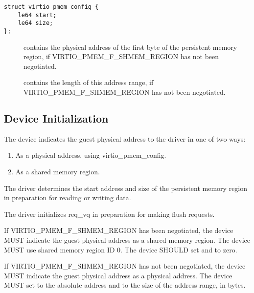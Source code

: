 \begin{lstlisting}
struct virtio_pmem_config {
	le64 start;
	le64 size;
};
\end{lstlisting}

\begin{description}
\item[] contains the physical address of the first byte of the
persistent memory region, if VIRTIO_PMEM_F_SHMEM_REGION has not been negotiated.

\item[] contains the length of this address range, if
VIRTIO_PMEM_F_SHMEM_REGION has not been negotiated.
\end{description}

\subsection{Device Initialization}\label{sec:Device Types / PMEM Device / Device Initialization}

The device indicates the guest physical address to the driver in one of two ways:
\begin{enumerate}
\item As a physical address, using virtio_pmem_config.
\item As a shared memory region.
\end{enumerate}

The driver determines the start address and size of the persistent memory region in preparation for reading or writing data.

The driver initializes req_vq in preparation for making flush requests.


If VIRTIO_PMEM_F_SHMEM_REGION has been negotiated, the device MUST indicate the
guest physical address as a shared memory region. The device MUST use shared
memory region ID 0. The device SHOULD set  and  to zero.

If VIRTIO_PMEM_F_SHMEM_REGION has not been negotiated, the device MUST indicate
the guest physical address as a physical address. The device MUST set
 to the absolute address and  to the size of the
address range, in bytes.

